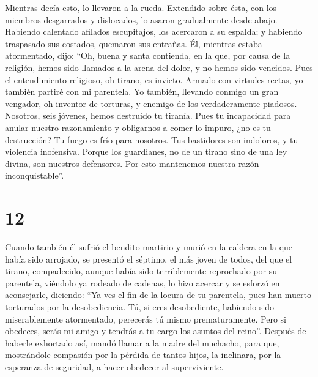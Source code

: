 Mientras decía esto, lo llevaron a la rueda.
 Extendido sobre ésta, con los miembros desgarrados y
dislocados, lo asaron gradualmente desde abajo.  Habiendo
calentado afilados escupitajos, los acercaron a su espalda; y habiendo
traspasado sus costados, quemaron sus entrañas.  Él,
mientras estaba atormentado, dijo: ``Oh, buena y santa contienda, en la
que, por causa de la religión, hemos sido llamados a la arena del dolor,
y no hemos sido vencidos.  Pues el entendimiento
religioso, oh tirano, es invicto.  Armado con virtudes
rectas, yo también partiré con mi parentela.  Yo también,
llevando conmigo un gran vengador, oh inventor de torturas, y enemigo de
los verdaderamente piadosos.  Nosotros, seis jóvenes,
hemos destruido tu tiranía.  Pues tu incapacidad para
anular nuestro razonamiento y obligarnos a comer lo impuro, ¿no es tu
destrucción?  Tu fuego es frío para nosotros. Tus
bastidores son indoloros, y tu violencia inofensiva. 
Porque los guardianes, no de un tirano sino de una ley divina, son
nuestros defensores. Por esto mantenemos nuestra razón inconquistable''.

\hypertarget{section-11}{%
\section{12}\label{section-11}}

 Cuando también él sufrió el bendito martirio y murió en
la caldera en la que había sido arrojado, se presentó el séptimo, el más
joven de todos,  del que el tirano, compadecido, aunque
había sido terriblemente reprochado por su parentela, 
viéndolo ya rodeado de cadenas, lo hizo acercar y se esforzó en
aconsejarle, diciendo:  ``Ya ves el fin de la locura de tu
parentela, pues han muerto torturados por la desobediencia. Tú, si eres
desobediente, habiendo sido miserablemente atormentado, perecerás tú
mismo prematuramente.  Pero si obedeces, serás mi amigo y
tendrás a tu cargo los asuntos del reino''.  Después de
haberle exhortado así, mandó llamar a la madre del muchacho, para que,
mostrándole compasión por la pérdida de tantos hijos, la inclinara, por
la esperanza de seguridad, a hacer obedecer al superviviente.

